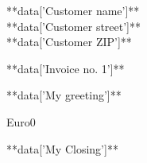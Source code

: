 \documentclass{letter}
\date{**data['23. May 2009']**}
\begin{document}
  \begin{letter}{**data['Customer name']** \\ **data['Customer street']** \\ **data['Customer ZIP']**}
    \opening{**data['Invoice no. 1']**}
    **data['My greeting']**
    \begin{invoice}{Euro}{0}
    \end{invoice}
    \closing{**data['My Closing']**}
  \end{letter}
\end{document}
